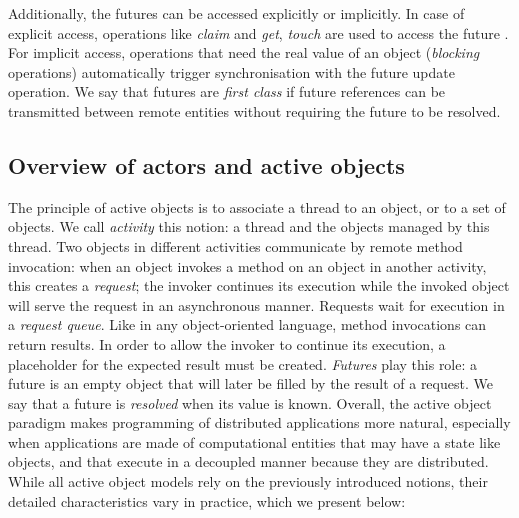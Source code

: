 Additionally, the futures can be accessed explicitly or implicitly. In
case of explicit access, operations like \emph{claim} and \emph{get},
\emph{touch} are used to access the future \cite{Elinar2006,ABCL1994}.
For implicit access, operations that need the real value of an object
(\emph{blocking} operations) automatically trigger synchronisation
with the future update operation. We say that futures are \emph{first
	class} if future references can be transmitted between remote
entities without requiring the future to be resolved.




\subsection{Overview of actors and active objects}\label{overview}
\cite{2013-Henrio}
The principle of active objects is to associate a thread to an object, or to a set of
objects. We call \emph{activity} this notion: a thread and the objects
managed by this thread.  Two objects in different activities 
communicate by remote method invocation: when an object invokes a
method on an object in another activity, this creates a
\emph{request}; the invoker continues its execution while the invoked
object will serve the request in an asynchronous manner. Requests wait for execution in a \emph{request queue}. Like in any
object-oriented language, method invocations can return results. In
order to allow the invoker to continue its execution, a placeholder
for the expected result must be created. \emph{Futures} play this
role: a future is an empty object that will later be filled by the
result of a request. We say that a future is \emph{resolved} when its
value is known.
 Overall, the active object paradigm makes programming of distributed
 applications more natural, especially when applications are made of
computational entities that may have a state like objects, and that
execute in a decoupled manner because they are distributed.
While all active object models rely on the previously introduced notions, their
detailed characteristics vary in practice, which we present below:

